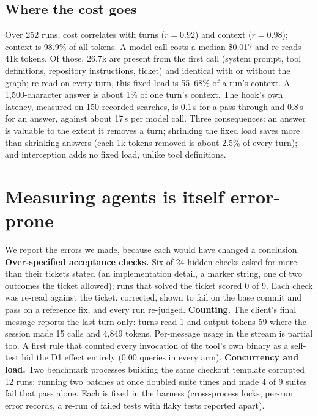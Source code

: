 \documentclass[conference]{IEEEtran}
\begin{document}
\subsection{Where the cost goes}\label{sec:cost}
Over 252 runs, cost correlates with turns ($r=0.92$) and context ($r=0.98$); context is 98.9\% of all tokens. A model
call costs a median \$0.017 and re-reads 41k tokens. Of those, 26.7k are present from the first call (system prompt,
tool definitions, repository instructions, ticket) and identical with or without the graph; re-read on every turn, this
fixed load is 55--68\% of a run's context. A 1{,}500-character answer is about 1\% of one turn's context. The hook's own
latency, measured on 150 recorded searches, is 0.1\,s for a pass-through and 0.8\,s for an answer, against about 17\,s
per model call. Three consequences: an answer is valuable to the extent it removes a turn; shrinking the fixed load
saves more than shrinking answers (each 1k tokens removed is about 2.5\% of every turn); and interception adds no fixed
load, unlike tool definitions.

\section{Measuring agents is itself error-prone}\label{sec:measure}
We report the errors we made, because each would have changed a conclusion. \textbf{Over-specified acceptance checks.}
Six of 24 hidden checks asked for more than their tickets stated (an implementation detail, a marker string, one of two
outcomes the ticket allowed); runs that solved the ticket scored 0 of 9. Each check was re-read against the ticket,
corrected, shown to fail on the base commit and pass on a reference fix, and every run re-judged. \textbf{Counting.} The
client's final message reports the last turn only: turns read 1 and output tokens 59 where the session made 15 calls
and 4{,}849 tokens. Per-message usage in the stream is partial too. A first rule that counted every invocation of the
tool's own binary as a self-test hid the D1 effect entirely (0.00 queries in every arm). \textbf{Concurrency and load.}
Two benchmark processes building the same checkout template corrupted 12 runs; running two batches at once doubled
suite times and made 4 of 9 suites fail that pass alone. Each is fixed in the harness (cross-process locks, per-run error
records, a re-run of failed tests with flaky tests reported apart).
\end{document}
